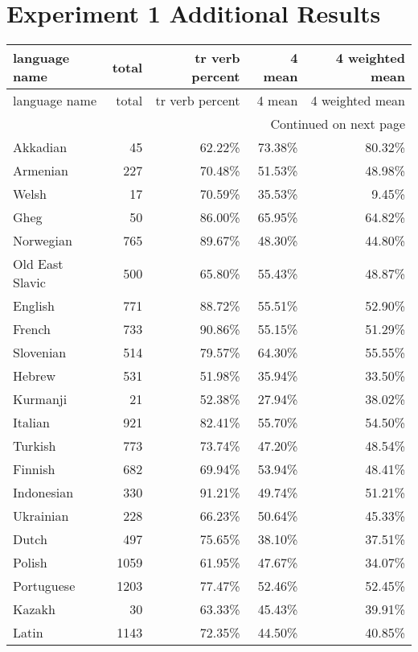 \chapter{Experiment 1 Additional Results}
\begin{longtable}{lrrrr}
    \toprule
    language name & total & tr verb percent & 4 mean & 4 weighted mean \\
    \midrule
    \endfirsthead
    \toprule
    language name & total & tr verb percent & 4 mean & 4 weighted mean \\
    \midrule
    \endhead
    \midrule
    \multicolumn{5}{r}{Continued on next page} \\
    \midrule
    \endfoot
    \bottomrule
    \endlastfoot
    Akkadian & 45 & 62.22\% & 73.38\% & 80.32\% \\
    Armenian & 227 & 70.48\% & 51.53\% & 48.98\% \\
    Welsh & 17 & 70.59\% & 35.53\% & 9.45\% \\
    Gheg & 50 & 86.00\% & 65.95\% & 64.82\% \\
    Norwegian & 765 & 89.67\% & 48.30\% & 44.80\% \\
    Old East Slavic & 500 & 65.80\% & 55.43\% & 48.87\% \\
    English & 771 & 88.72\% & 55.51\% & 52.90\% \\
    French & 733 & 90.86\% & 55.15\% & 51.29\% \\
    Slovenian & 514 & 79.57\% & 64.30\% & 55.55\% \\
    Hebrew & 531 & 51.98\% & 35.94\% & 33.50\% \\
    Kurmanji & 21 & 52.38\% & 27.94\% & 38.02\% \\
    Italian & 921 & 82.41\% & 55.70\% & 54.50\% \\
    Turkish & 773 & 73.74\% & 47.20\% & 48.54\% \\
    Finnish & 682 & 69.94\% & 53.94\% & 48.41\% \\
    Indonesian & 330 & 91.21\% & 49.74\% & 51.21\% \\
    Ukrainian & 228 & 66.23\% & 50.64\% & 45.33\% \\
    Dutch & 497 & 75.65\% & 38.10\% & 37.51\% \\
    Polish & 1059 & 61.95\% & 47.67\% & 34.07\% \\
    Portuguese & 1203 & 77.47\% & 52.46\% & 52.45\% \\
    Kazakh & 30 & 63.33\% & 45.43\% & 39.91\% \\
    Latin & 1143 & 72.35\% & 44.50\% & 40.85\% \\

\end{longtable}
